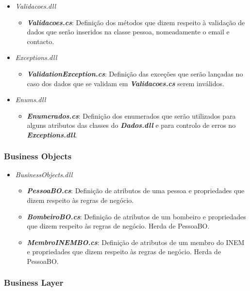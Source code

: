 \documentclass[11pt]{scrartcl} %
\begin{document}
\begin{itemize}
	\item \textit{Validacoes.dll}
	\begin{itemize}
		\item \emph{\textbf{Validacoes.cs}}: Definição dos métodos que dizem respeito à validação de dados que serão inseridos na classe pessoa, nomeadamente o email e contacto.
	\end{itemize}
	\item \textit{Exceptions.dll}
	\begin{itemize}
		\item \emph{\textbf{ValidationException.cs}}: Definição das exceções que serão lançadas no caso dos dados que se validam em \emph{\textbf{Validacoes.cs}} serem inválidos.
	\end{itemize}
	\item \textit{Enums.dll}
	\begin{itemize}
		\item \emph{\textbf{Enumerados.cs}}: Definição dos enumerados que serão utilizados para alguns atributos das classes do \emph{\textbf{Dados.dll}} e para controlo de erros no \emph{\textbf{Exceptions.dll}}.
	\end{itemize}
\end{itemize}

\subsubsection{Business Objects}

\begin{itemize}
	\item \textit{BusinessObjects.dll}
	\begin{itemize}
		\item \emph{\textbf{PessoaBO.cs}}: Definição de atributos de uma pessoa e propriedades que dizem respeito às regras de negócio.
		\item \emph{\textbf{BombeiroBO.cs}}: Definição de atributos de um bombeiro e propriedades que dizem respeito às regras de negócio. Herda de PessoaBO.
		\item \emph{\textbf{MembroINEMBO.cs}}: Definição de atributos de um membro do INEM e propriedades que dizem respeito às regras de negócio. Herda de PessoaBO.
	\end{itemize}
\end{itemize}

\subsubsection{Business Layer}
\end{document}
